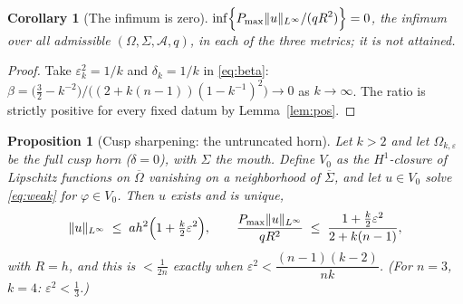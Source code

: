 \documentclass[10pt]{article}
\newtheorem{proposition}[theorem]{Proposition}
\newtheorem{corollary}[theorem]{Corollary}
\theoremstyle{remark}
\newcommand{\A}{\mathcal{A}}
\newcommand{\Om}{\Omega}
\newcommand{\Sig}{\Sigma}
\newcommand{\Pmax}{P_{\max}}
\newcommand{\norminf}[1]{\|#1\|_{L^\infty}}
\newcommand{\eps}{\varepsilon}
\begin{document}
\begin{corollary}[The infimum is zero]\label{cor:inf}
$\displaystyle
\inf\Bigl\{\Pmax\norminf{u}/(q R^2)\Bigr\}=0$, the infimum over all admissible
$(\Om,\Sig,\A,q)$, in each of the three metrics; it is not attained.
\end{corollary}

\begin{proof}
Take $\eps_k^2=1/k$ and $\delta_k=1/k$ in \eqref{eq:beta}:
$\beta=\bigl(\tfrac32-k^{-2}\bigr)/\bigl((2+k(n-1))(1-k^{-1})^2\bigr)
\to 0$ as $k\to\infty$. The ratio is strictly positive for every fixed datum by
Lemma~\ref{lem:pos}.
\end{proof}

\begin{proposition}[Cusp sharpening: the untruncated horn]\label{prop:cusp}
Let $k>2$ and let $\Om_{k,\eps}$ be the full cusp horn ($\delta=0$), with
$\Sig$ the mouth. Define
$V_0$ as the $H^1$-closure of Lipschitz functions on $\overline\Om$ vanishing
on a neighborhood of $\overline\Sig$, and let $u\in V_0$ solve \eqref{eq:weak}
for $\varphi\in V_0$. Then $u$ exists and is unique,
\[
\norminf{u}\;\le\;a h^2\Bigl(1+\tfrac{k}{2}\eps^2\Bigr),
\qquad
\frac{\Pmax\norminf{u}}{qR^2}\;\le\;\frac{1+\tfrac k2\eps^2}{2+k(n-1)},
\]
with $R=h$, and this is $<\tfrac{1}{2n}$ exactly when
$\eps^2<\dfrac{(n-1)(k-2)}{nk}$. (For $n=3$, $k=4$: $\eps^2<\tfrac13$.)
\end{proposition}
\end{document}

